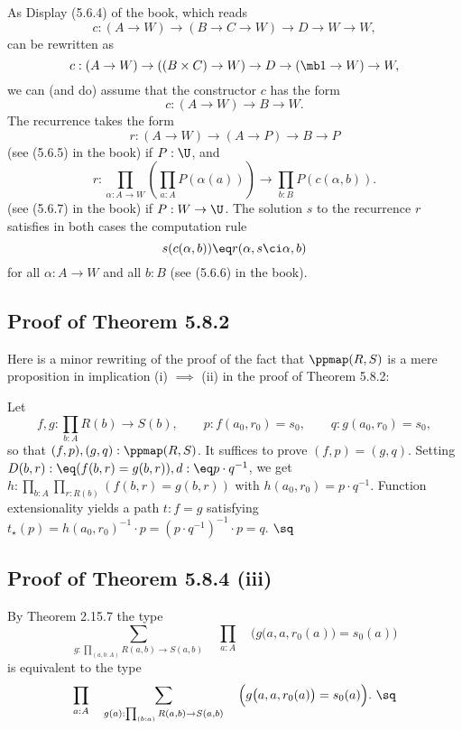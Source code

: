 \documentclass[12pt]{article}
\begin{document}
As Display (5.6.4) of the book, which reads 
$$
c:(A\to W)\to(B\to C\to W)\to D\to W\to W,
$$ 
can be rewritten as 
$$
c:(A\to W)\to((B\times C)\to W)\to D\to(\mb1\to W)\to W,
$$ 
we can (and do) assume that the constructor $c$ has the form 
$$
c:(A\to W)\to B\to W.
$$ 
The recurrence takes the form 
$$
r:(A\to W)\to(A\to P)\to B\to P
$$ 
(see (5.6.5) in the book) if $P:\U$, and 
$$
r:\prod_{\alpha:A\to W}\left(\prod_{a:A} P(\alpha(a))\right)\to\prod_{b:B}P(c(\alpha,b)).
$$ 
(see (5.6.7) in the book) if $P:W\to\U$. The solution $s$ to the recurrence $r$ satisfies in both cases the computation rule
$$
s(c(\alpha,b))\eq r(\alpha,s\ci\alpha,b)
$$ 
for all $\alpha:A\to W$ and all $b:B$ (see (5.6.6) in the book).


\subsection{Proof of Theorem 5.8.2}\label{582}

Here is a minor rewriting of the proof of the fact that $\ppmap(R,S)$ is a mere proposition in implication (i) $\implies$ (ii) in the proof of Theorem 5.8.2: 

Let 
$$
f,g:\prod_{b:A}R(b)\to S(b),\qquad p:f(a_0,r_0)=s_0,\qquad q:g(a_0,r_0)=s_0,
$$ 
so that $(f,p),(g,q):\ppmap(R,S)$. It suffices to prove $(f,p)=(g,q)$. Setting $D(b,r):\eq(f(b,r)=g(b,r)),d:\eq p\cdot q^{-1}$, we get $h:\prod_{b:A}\prod_{r:R(b)}(f(b,r)=g(b,r))$ with $h(a_0,r_0)=p\cdot q^{-1}$. Function extensionality yields a path $t:f=g$ satisfying $t_\star(p)=h(a_0,r_0)^{-1}\cdot p=(p\cdot q^{-1})^{-1}\cdot p=q$. $\sq$ 


\subsection{Proof of Theorem 5.8.4 (iii)}

By Theorem 2.15.7 the type 
$$
\sum_{g:\prod_{(a,b:A)}R(a,b)\to S(a,b)}\quad\prod_{a:A}\quad\Big(g\big(a,a,r_0(a)\big)=s_0(a)\Big)
$$ 
is equivalent to the type
$$
\prod_{a:A}\quad\sum_{g(a):\prod_{(b:a)}R(a,b)\to S(a,b)}\quad\Big(g\big(a,a,r_0(a)\big)=s_0(a)\Big).\ \sq
$$



\end{document}
